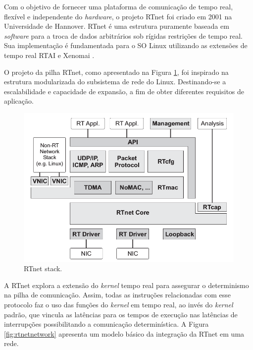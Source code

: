 \documentclass[conference]{IEEEtran}
\begin{document}
Com o objetivo de fornecer uma plataforma de comunicação de tempo real, flexível e independente do \textit{hardware}, o projeto RTnet foi criado em 2001 na Universidade de Hannover. RTnet é uma estrutura puramente baseada em \textit{software} para a troca de dados arbitrários sob rígidas restrições de tempo real. Sua implementação é fundamentada para o SO Linux utilizando as extensões de tempo real RTAI e Xenomai \cite{xenomai_rtnet}. 	%

O projeto da pilha RTnet, como apresentado na Figura \ref{fig:rtnetstack}, foi inspirado na estrutura modularizada do subsistema de rede do Linux. Destinando-se a escalabilidade e capacidade de expansão, a fim de obter diferentes requisitos de aplicação.

\begin{figure}[h]
	\centering
	\includegraphics[scale=0.22]{files/rtnet_stack.png}
	\caption{RTnet stack.  \cite{rtnet_org}}
	\label{fig:rtnetstack}
\end{figure}

A RTnet explora a extensão do \textit{kernel} tempo real para assegurar o determinismo na pilha de comunicação. Assim, todas as instruções relacionadas com esse protocolo faz o uso das funções do \textit{kernel} em tempo real, ao invés do \textit{kernel} padrão, que vincula as latências para os tempos de execução nas latências de interrupções possibilitando a comunicação determinística. A Figura \ref{fig:rtnetnetwork} apresenta um modelo básico da integração da RTnet em uma rede.
\end{document}
